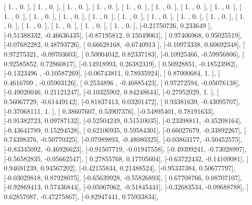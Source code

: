 \documentclass{article}
\begin{document}
       [ 1.        ,  0.        ],
       [ 1.        ,  0.        ],
       [ 1.        ,  0.        ],
       [ 1.        ,  0.        ],
       [ 1.        ,  0.        ],
       [ 1.        ,  0.        ],
       [ 1.        ,  0.        ],
       [ 1.        ,  0.        ],
       [ 1.        ,  0.        ],
       [ 1.        ,  0.        ],
       [ 1.        ,  0.        ],
       [ 1.        ,  0.        ],
       [ 1.        ,  0.        ],
       [ 1.        ,  0.        ],
       [ 1.        ,  0.        ],
       [ 1.        ,  0.        ],
       [ 1.        ,  0.        ],
       [ 1.        ,  0.        ],
       [ 1.        ,  0.        ],
       [ 1.        ,  0.        ],
       [ 1.        ,  0.        ],
       [-0.21750726,  0.233649  ],
       [-0.51388332, -0.46636435],
       [-0.87195812,  0.15049061],
       [ 0.97406968,  0.95025519],
       [-0.07682282,  0.48793726],
       [ 0.66628168, -0.6740913 ],
       [-0.10973338,  0.60692348],
       [ 0.97275321, -0.09703603],
       [ 0.50004042,  0.82337183],
       [-0.10925466, -0.59956806],
       [ 0.92585852,  0.72860817],
       [-0.14918993,  0.26382319],
       [ 0.50928851, -0.18523982],
       [-0.1323496 , -0.10587269],
       [-0.06743811,  0.78935924],
       [ 0.87000684,  1.        ],
       [ 0.4616709 , -0.05903126],
       [ 0.2534896 , -0.46885423],
       [ 0.97272594, -0.05076138],
       [-0.49020046,  0.21121247],
       [-0.10325902,  0.84248644],
       [-0.27952029,  1.        ],
       [ 0.56067729, -0.61449142],
       [-0.81837413,  0.03201472],
       [ 0.93381639, -0.43095707],
       [-0.37068111,  1.        ],
       [ 0.38607607,  0.53907376],
       [-0.54895401,  0.78191633],
       [-0.91382723,  0.09787132],
       [-0.52504249,  0.51510035],
       [-0.23398811, -0.45208164],
       [-0.43641789,  0.15294528],
       [ 0.62106935,  0.59584301],
       [-0.66027679, -0.33892267],
       [ 0.74398376, -0.50770325],
       [-0.07989893, -0.48080325],
       [-0.03863177, -0.50452575],
       [-0.83345092, -0.46926623],
       [-0.91507719, -0.01947558],
       [-0.49399241, -0.73028997],
       [-0.56582835, -0.05662547],
       [ 0.27855768,  0.17705604],
       [-0.63722432, -0.14109081],
       [ 0.94691239,  0.94567202],
       [-0.42155834,  0.21488524],
       [-0.95337384,  0.50677797],
       [-0.03029818,  0.87928075],
       [-0.65639928, -0.55826893],
       [ 0.67708766,  0.08707107],
       [-0.92869413,  0.57436844],
       [-0.05067062, -0.51845441],
       [-0.32683534, -0.09688788],
       [ 0.62857087, -0.47275867],
       [-0.82947441,  0.75933834],
\end{document}

